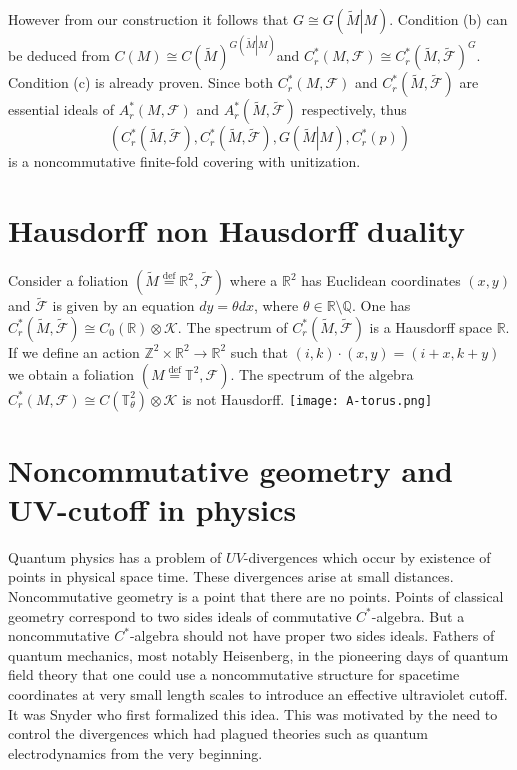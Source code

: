 \documentclass{beamer}
\theoremstyle{plain}
\newcommand{\sF}{\mathcal{F}}       %
\newcommand{\bydef}{\stackrel{\mathrm{def}}{=}}
\begin{document}
\begin{frame}
	However from our construction it follows that $G \cong G\left(\left.\widetilde M\right| M\right)$.
	Condition (b) can be deduced from $C\left(M\right)\cong C\left(\widetilde M\right)^{G\left(\left.\widetilde M\right| M\right)}$and $C^*_r\left( M, {\sF}\right) \cong C^*_r \left(\widetilde M, \widetilde{\sF}\right)^G$. Condition (c) is already proven. Since both $C^*_r\left( M, {\sF}\right)$  and $C^*_r \left(\widetilde M, \widetilde{\sF}\right)$ are essential ideals of $A^*_r\left( M, {\sF}\right)$  and $A^*_r \left(\widetilde M, \widetilde{\sF}\right)$ respectively, thus $$
	\left(C^*_r \left(\widetilde M, \widetilde{\sF}\right), C^*_r \left(\widetilde M, \widetilde{\sF}\right), G\left(\left.\widetilde M\right| M\right), C^*_r\left(p \right) \right)
	$$
	is a noncommutative finite-fold covering with unitization.
	
\end{frame}
\section{Hausdorff non Hausdorff duality}
\begin{frame}
	Consider a foliation $\left(\widetilde M \bydef \mathbb R^2, \widetilde{\mathcal F}\right)$ where a $ \mathbb R^2$ has Euclidean coordinates $\left(x, y\right)$ and $\widetilde{\mathcal F}$ is given by an equation $dy = \theta dx$, where $\theta \in \mathbb R \setminus \mathbb Q$. One has $C^*_r\left(\widetilde M, \widetilde{\mathcal F}\right)\cong C_0\left(\mathbb R \right)\otimes \mathcal K $. The spectrum of $C^*_r\left(\widetilde M, \widetilde{\mathcal F}\right)$ is a Hausdorff space $\mathbb R$.
	If we define an action $\mathbb Z^2 \times \mathbb R^2 \to \mathbb R^2$ such that $\left(i,k\right)\cdot \left(x,y\right)=\left(i + x,k + y\right)$ we obtain a foliation $\left(M \bydef \mathbb T^2, {\mathcal F}\right)$. The spectrum of the algebra $C^*_r\left( M, {\mathcal F}\right)\cong C\left( \mathbb T^2_\theta \right) \otimes \mathcal K $ is not Hausdorff.
	\texttt{[image: A-torus.png]}
\end{frame}
\section{Noncommutative geometry and UV-cutoff in physics}
\begin{frame}
	Quantum physics has a problem of $UV$-divergences which occur by existence of points in physical space time. These divergences arise at small distances. Noncommutative geometry is a point that there are no points. Points of classical geometry correspond to two sides ideals of commutative $C^*$-algebra. But a noncommutative $C^*$-algebra should not have proper two sides ideals.
Fathers of quantum mechanics, most
notably Heisenberg, in the pioneering days of quantum field theory that one could use
a noncommutative structure for spacetime coordinates at very small length scales to
introduce an effective ultraviolet cutoff. It was Snyder  who first formalized this idea. This was motivated by the need to control the
divergences which had plagued theories such as quantum electrodynamics from the very
beginning.
\end{frame}
\end{document}
